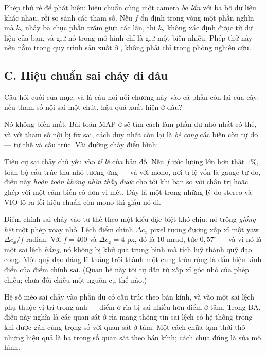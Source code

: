 \documentclass[../../vslam.tex]{subfiles}
\begin{document}
Phép thử rẻ để phát hiện: hiệu chuẩn cùng một camera \emph{ba lần} với ba bộ dữ liệu khác nhau, rồi so sánh các tham số. Nếu \(f\) ổn định trong vòng một phần nghìn mà \(k_2\) nhảy ba chục phần trăm giữa các lần, thì \(k_2\) không xác định được từ dữ liệu của bạn, và giữ nó trong mô hình chỉ là giữ một biến nhiễu. Phép thử này nên nằm trong quy trình sản xuất ở , không phải chỉ trong phòng nghiên cứu.

\subsection{C. Hiệu chuẩn sai chảy đi đâu}

Câu hỏi cuối của mục, và là câu hỏi nối chương này vào cả phần còn lại của cây: nếu tham số nội sai một chút, hậu quả xuất hiện ở đâu?

Nó không biến mất. Bài toán MAP ở  sẽ tìm cách làm phần dư nhỏ nhất có thể, và với tham số nội bị fix sai, cách duy nhất còn lại là \emph{bẻ cong} các biến còn tự do --- tư thế và cấu trúc. Vài đường chảy điển hình:

Tiêu cự sai chảy chủ yếu vào \emph{tỉ lệ} của bản đồ. Nếu \(f\) ước lượng lớn hơn thật \(1\%\), toàn bộ cấu trúc thu nhỏ tương ứng --- và với mono, nơi tỉ lệ vốn là gauge tự do, điều này \emph{hoàn toàn không nhìn thấy được} cho tới khi bạn so với chân trị hoặc ghép với một cảm biến có đơn vị mét. Đây là một trong những lý do stereo và VIO lộ ra lỗi hiệu chuẩn còn mono thì giấu nó đi.

Điểm chính sai chảy vào tư thế theo một kiểu đặc biệt khó chịu: nó trông \emph{giống hệt} một phép xoay nhỏ. Lệch điểm chính \(\Delta c_x\) pixel tương đương xấp xỉ một yaw \(\Delta c_x / f\) radian. Với \(f = 400\) và \(\Delta c_x = 4\) px, đó là \(10\) mrad, tức \(0{,}57^\circ\) --- và vì nó là một sai lệch \emph{hằng}, nó không bị khử qua trung bình mà tích luỹ thành quỹ đạo cong. Một quỹ đạo đáng lẽ thẳng trôi thành một cung tròn rộng là dấu hiệu kinh điển của điểm chính sai. (Quan hệ này tôi tự dẫn từ xấp xỉ góc nhỏ của phép chiếu; chưa đối chiếu một nguồn cụ thể nào.)

Hệ số méo sai chảy vào phần dư có cấu trúc theo bán kính, và vào một sai lệch phụ thuộc vị trí trong ảnh --- điểm ở rìa bị sai nhiều hơn điểm ở tâm. Trong BA, điều này nghĩa là các quan sát ở rìa mang thông tin sai lệch có hệ thống trong khi được gán cùng trọng số với quan sát ở tâm. Một cách chữa tạm thời thô nhưng hiệu quả là hạ trọng số quan sát theo bán kính; cách chữa đúng là sửa mô hình.
\end{document}
